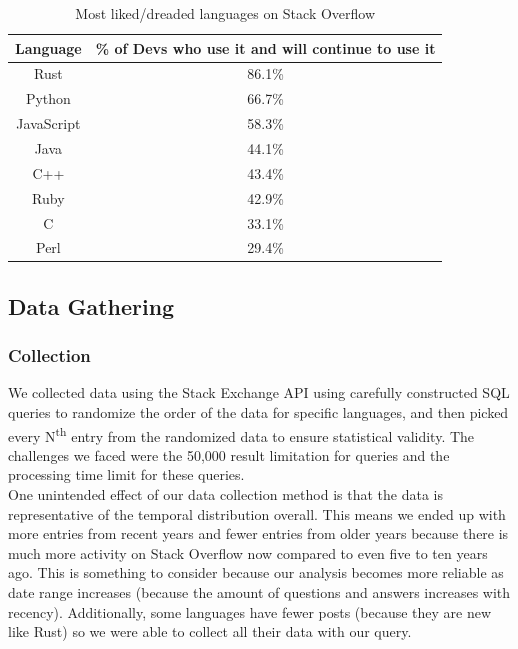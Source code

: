 \documentclass[conference]{IEEEtran}
\begin{document}
\begin{table}[htbp]
\caption{Most liked/dreaded languages on Stack Overflow}
\begin{center}
\begin{tabular}{|c|c|}
\hline
\textbf{Language}&\textbf{\% of Devs who use it and will continue to use it}\\
\hline
Rust&86.1\%\\
\hline
Python&66.7\%\\
\hline
JavaScript&58.3\%\\
\hline
Java&44.1\%\\
\hline
C++&43.4\%\\
\hline
Ruby&42.9\%\\
\hline
C&33.1\%\\
\hline
Perl&29.4\%\\
\hline
\end{tabular}
\label{tab1}
\end{center}
\end{table}

\subsection{Data Gathering}
\subsubsection{Collection}
We collected data using the Stack Exchange API \cite{b28} using carefully constructed SQL queries to randomize the order of the data for specific languages, and then picked every N\textsuperscript{th} entry from the randomized data to ensure statistical validity. The challenges we faced were the 50,000 result limitation for queries and the processing time limit for these queries.\\

One unintended effect of our data collection method is that the data is representative of the temporal distribution overall. This means we ended up with more entries from recent years and fewer entries from older years because there is much more activity on Stack Overflow now compared to even five to ten years ago. This is something to consider because our analysis becomes more reliable as date range increases (because the amount of questions and answers increases with recency). Additionally, some languages have fewer posts (because they are new like Rust) so we were able to collect all their data with our query.\\
\end{document}
